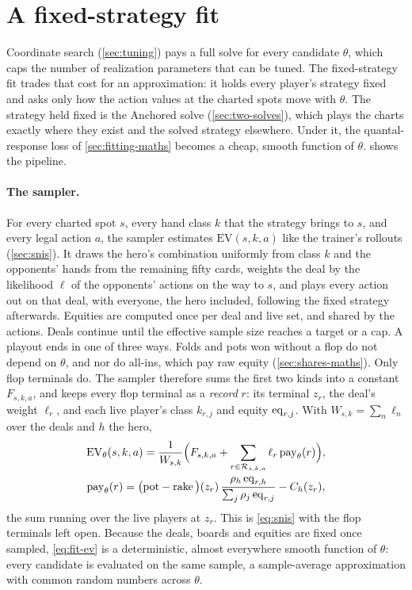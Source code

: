 \section{A fixed-strategy fit}\label{sec:fixed-fit}

Coordinate search (\cref{sec:tuning}) pays a full solve for every candidate $\theta$, which caps the number of
realization parameters that can be tuned. The fixed-strategy fit trades that cost for an approximation: it holds every
player's strategy fixed and asks only how the action values at the charted spots move with $\theta$. The strategy held
fixed is the Anchored solve (\cref{sec:two-solves}), which plays the charts exactly where they exist and the solved
strategy elsewhere. Under it, the quantal-response loss of \cref{sec:fitting-maths} becomes a cheap, smooth function of
$\theta$.  shows the pipeline.

\paragraph{The sampler.}
For every charted spot $s$, every hand class $k$ that the strategy brings to $s$, and every legal action $a$, the
sampler estimates $\mathrm{EV}(s,k,a)$ like the trainer's rollouts (\cref{sec:snis}). It draws the hero's combination
uniformly from class $k$ and the opponents' hands from the remaining fifty cards, weights the deal by the likelihood
$\ell$ of the opponents' actions on the way to $s$, and plays every action out on that deal, with everyone, the hero
included, following the fixed strategy afterwards. Equities are computed once per deal and live set, and shared by the
actions. Deals continue until the effective sample size reaches a target or a cap. A playout ends in one of three
ways. Folds and pots won without a flop do not depend on $\theta$, and nor do all-ins, which pay raw equity
(\cref{sec:shares-maths}). Only flop terminals do. The sampler therefore sums the first two kinds into a constant
$F_{s,k,a}$, and keeps every flop terminal as a \emph{record} $r$: its terminal $z_r$, the deal's weight $\ell_r$, and
each live player's class $k_{r,j}$ and equity $\mathrm{eq}_{r,j}$. With $W_{s,k} = \sum_n \ell_n$ over the deals and $h$ the
hero,
\begin{gather}
  \mathrm{EV}_\theta(s,k,a) = \frac{1}{W_{s,k}}\Big(F_{s,k,a} + \sum_{r \in \mathcal R_{s,k,a}} \ell_r\, \mathrm{pay}_\theta(r)\Big),
  \label{eq:fit-ev}\\
  \mathrm{pay}_\theta(r) = \big(\mathrm{pot} - \operatorname{rake}\big)(z_r)\, \frac{\rho_h\, \mathrm{eq}_{r,h}}{\sum_{j} \rho_j\, \mathrm{eq}_{r,j}} - C_h(z_r),
  \nonumber
\end{gather}
the sum running over the live players at $z_r$. This is \eqref{eq:snis} with the flop terminals left open. Because the
deals, boards and equities are fixed once sampled, \eqref{eq:fit-ev} is a deterministic, almost everywhere smooth
function of $\theta$: every candidate is evaluated on the same sample, a sample-average approximation with common random
numbers across $\theta$.

